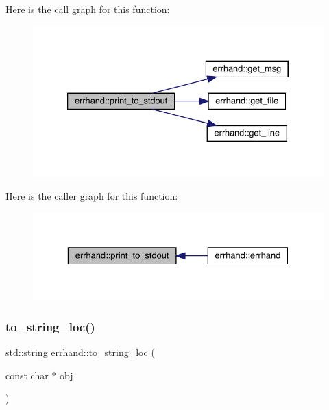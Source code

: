 Here is the call graph for this function\+:\nopagebreak
\begin{figure}[H]
\begin{center}
\leavevmode
\includegraphics[width=333pt]{classerrhand_a5b4d8a74f1d0c6842526dc8b54e38dc2_cgraph}
\end{center}
\end{figure}
Here is the caller graph for this function\+:\nopagebreak
\begin{figure}[H]
\begin{center}
\leavevmode
\includegraphics[width=329pt]{classerrhand_a5b4d8a74f1d0c6842526dc8b54e38dc2_icgraph}
\end{center}
\end{figure}
\mbox{\label{classerrhand_a930df1c197154853159683cb2ad55369}} 
\subsubsection{\texorpdfstring{to\+\_\+string\+\_\+loc()}{to\_string\_loc()}}
{\footnotesize\ttfamily std\+::string errhand\+::to\+\_\+string\+\_\+loc (\begin{DoxyParamCaption}\item[{const char $\ast$}]{obj }\end{DoxyParamCaption})\hspace{0.3cm}{\ttfamily [inline]}}



